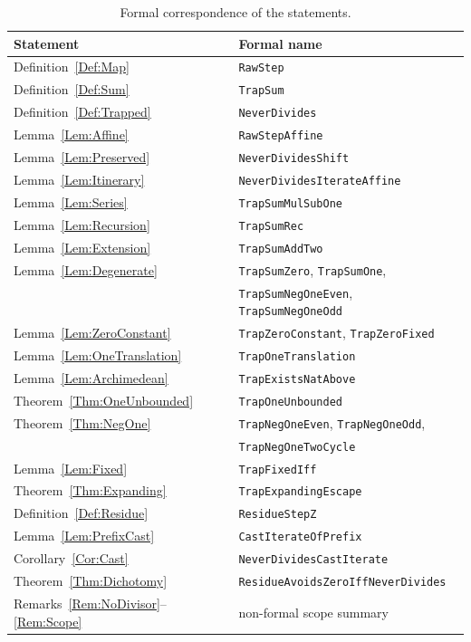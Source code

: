 \documentclass[11pt,letterpaper]{article}
\begin{document}
\begin{table}[htbp]
\centering
\begin{tabular}{ll}
\toprule
Statement & Formal name \\
\midrule
Definition~\ref{Def:Map} & \texttt{RawStep} \\
Definition~\ref{Def:Sum} & \texttt{TrapSum} \\
Definition~\ref{Def:Trapped} & \texttt{NeverDivides} \\
Lemma~\ref{Lem:Affine} & \texttt{RawStepAffine} \\
Lemma~\ref{Lem:Preserved} & \texttt{NeverDividesShift} \\
Lemma~\ref{Lem:Itinerary} & \texttt{NeverDividesIterateAffine} \\
Lemma~\ref{Lem:Series} & \texttt{TrapSumMulSubOne} \\
Lemma~\ref{Lem:Recursion} & \texttt{TrapSumRec} \\
Lemma~\ref{Lem:Extension} & \texttt{TrapSumAddTwo} \\
Lemma~\ref{Lem:Degenerate} & \texttt{TrapSumZero}, \texttt{TrapSumOne}, \\
 & \texttt{TrapSumNegOneEven}, \texttt{TrapSumNegOneOdd} \\
Lemma~\ref{Lem:ZeroConstant} & \texttt{TrapZeroConstant}, \texttt{TrapZeroFixed} \\
Lemma~\ref{Lem:OneTranslation} & \texttt{TrapOneTranslation} \\
Lemma~\ref{Lem:Archimedean} & \texttt{TrapExistsNatAbove} \\
Theorem~\ref{Thm:OneUnbounded} & \texttt{TrapOneUnbounded} \\
Theorem~\ref{Thm:NegOne} & \texttt{TrapNegOneEven}, \texttt{TrapNegOneOdd}, \\
 & \texttt{TrapNegOneTwoCycle} \\
Lemma~\ref{Lem:Fixed} & \texttt{TrapFixedIff} \\
Theorem~\ref{Thm:Expanding} & \texttt{TrapExpandingEscape} \\
Definition~\ref{Def:Residue} & \texttt{ResidueStepZ} \\
Lemma~\ref{Lem:PrefixCast} & \texttt{CastIterateOfPrefix} \\
Corollary~\ref{Cor:Cast} & \texttt{NeverDividesCastIterate} \\
Theorem~\ref{Thm:Dichotomy} & \texttt{ResidueAvoidsZeroIffNeverDivides} \\
Remarks~\ref{Rem:NoDivisor}--\ref{Rem:Scope} & non-formal scope summary \\
\bottomrule
\end{tabular}
\caption{Formal correspondence of the statements.}
\label{Table:SignedTrapsLean}
\end{table}
\end{document}
